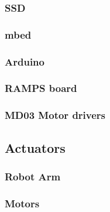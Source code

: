 \subsubsection{SSD}
\subsubsection{mbed}
\subsubsection{Arduino}
\subsubsection{RAMPS board}
\subsubsection{MD03 Motor drivers}

\subsection{Actuators}
\subsubsection{Robot Arm}
\subsubsection{Motors}

